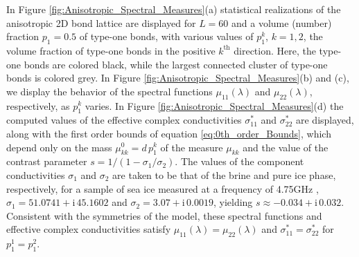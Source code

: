 \documentclass{cmslatex}
\newcommand{\I}{\mathrm{i}}
\begin{document}
In Figure \ref{fig:Anisotropic_Spectral_Measures}(a) statistical
realizations of the anisotropic 2D bond lattice are displayed for
$L=60$ and a volume (number) fraction $p_1=0.5$ of type-one bonds,
with various values of $p_1^k$, $k=1,2$, the volume fraction of
type-one bonds in the positive $k^{\text{th}}$ direction. Here, the
type-one bonds are colored black, while the largest connected cluster
of type-one bonds is colored grey. In Figure
\ref{fig:Anisotropic_Spectral_Measures}(b) and (c), we display the
behavior of the spectral functions $\mu_{11}(\lambda)$ and $\mu_{22}(\lambda)$,
respectively, as $p_1^k$ varies. In Figure
\ref{fig:Anisotropic_Spectral_Measures}(d) the computed values of the
effective complex conductivities $\sigma^*_{11}$ and $\sigma^*_{22}$ are   
displayed, along with the first order bounds of equation
\eqref{eq:0th_order_Bounds}, which depend only on the mass
$\mu^0_{kk}=d\,p_1^k$ of the measure $\mu_{kk}$ and the value of the contrast parameter
$s=1/(1-\sigma_1/\sigma_2)$. The values of the component conductivities $\sigma_1$
and $\sigma_2$ are taken to be that of the brine and pure ice phase,
respectively, for a sample of sea ice measured at a frequency of
4.75GHz \cite{Backstrom:2007:Book}, $\sigma_1=51.0741+\I\,45.1602$ and 
$\sigma_2=3.07+\I\,0.0019$, yielding
$s\approx-0.034+\I\,0.032$. Consistent with the symmetries of
the model, these spectral functions and effective complex
conductivities satisfy $\mu_{11}(\lambda)=\mu_{22}(\lambda)$ and $\sigma^*_{11}=\sigma^*_{22}$
for $p_1^1=p_1^2$. 
\end{document}
